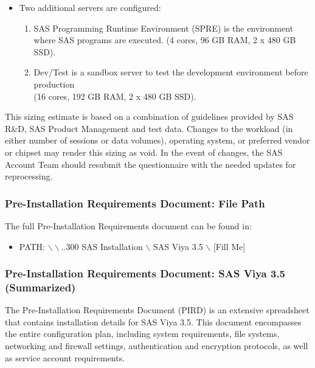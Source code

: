 \begin{enumerate}
\begin{itemize}
        \item Two additional servers are configured: 
        \begin{enumerate}
            \item SAS Programming Runtime Environment (SPRE) is the environment where SAS programs are executed. (4 cores, 96 GB RAM, 2 x 480 GB SSD). 
            \item Dev/Test is a sandbox server to test the development environment before production \\(16 cores, 192 GB RAM, 2 x 480 GB SSD).
        \end{enumerate}
    \end{itemize}
    
\end{enumerate}

This sizing estimate is based on a combination of guidelines provided by SAS R\&D, SAS Product Management and test data. Changes to the workload (in either number of sessions or data volumes), operating system, or preferred vendor or chipset may render this sizing as void. In the event of changes, the SAS Account Team should resubmit the questionnaire with the needed updates for reprocessing. 

\subsubsection{Pre-Installation Requirements Document: File Path}
The full Pre-Installation Requirements document can be found in: 
\begin{itemize}
    \item PATH: $\backslash\backslash$..300 SAS Installation $\backslash$ SAS Viya 3.5 $\backslash$ [Fill Me]
\end{itemize}

\subsubsection{Pre-Installation Requirements Document: SAS Viya 3.5 (Summarized)}

The Pre-Installation Requirements Document (PIRD) is an extensive spreadsheet that contains installation details for SAS Viya 3.5. This document encompasses the entire configuration plan, including system requirements, file systems, networking and firewall settings, authentication and encryption protocols, as well as service account requirements.

